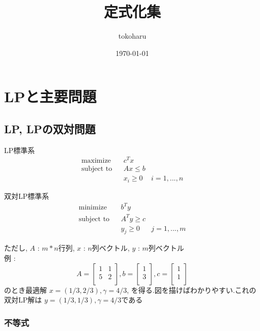 \documentclass[13pt, a4paper, landscape]{jarticle}
\title{定式化集}
\author{tokoharu}
\date {\today}
\theoremstyle{nonitalic} %
\begin{document}
\maketitle

\section{LPと主要問題}
\subsection {LP, LPの双対問題}

LP標準系
\begin{align}
 &&&&&\textrm{maximize}   && c^Tx \\
 &&&&&\textrm{subject to} && Ax \leq b  &&&&&\\
 &&&&&                    && x_i \geq 0 & i = 1,...,n &&&&&
\end{align}

双対LP標準系
\begin{align}
 &&&&&\textrm{minimize}   && b^Ty \\
 &&&&&\textrm{subject to} && A^T y \geq c  &&&&&\\
 &&&&&                    && y_j \geq 0 & j = 1,...,m &&&&&
\end{align}

ただし, 
$A$ : $m*n$行列, 
$x$ : $n$列ベクトル, 
$y$ : $m$列ベクトル \\

例 : 
\begin{equation*}
 A = 
 \left[\begin{array}{cc}
  1 & 1 \\
  5 & 2 \\
 \end{array}\right],
 b = 
 \left[\begin{array}{c}
     1 \\
     3 \\
   \end{array}\right],
 c = 
 \left[\begin{array}{c}
     1 \\
     1 \\
 \end{array}\right]
\end{equation*}
のとき最適解 $x = (1/3, 2/3) , \gamma = 4/3  $, を得る.図を描けばわかりやすい.これの双対LP解は
$y = (1/3, 1/3), \gamma = 4/3$である

\subsubsection{不等式}
\end{document}
